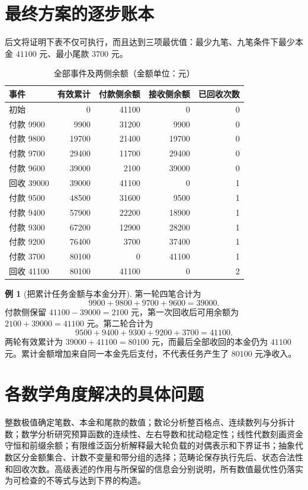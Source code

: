 \documentclass[UTF8,a4paper]{ctexbook}
\theoremstyle{definition}
\newtheorem{example}[theorem]{例}
\numberwithin{equation}{chapter}
\newcommand{\1}{\mathbf{1}}
\begin{document}
\section{最终方案的逐步账本}
后文将证明下表不仅可执行，而且达到三项最优值：最少九笔、九笔条件下最少本金 $41100$ 元、最小尾款 $3700$ 元。

\begin{table}[htbp]
\centering
\caption{全部事件及两侧余额（金额单位：元）}\label{model:ledger}
\begin{tabular}{@{}lrrrr@{}}
\toprule
事件 & 有效累计 & 付款侧余额 & 接收侧余额 & 已回收次数\\
\midrule
初始 & 0 & 41100 & 0 & 0\\
付款 9900 & 9900 & 31200 & 9900 & 0\\
付款 9800 & 19700 & 21400 & 19700 & 0\\
付款 9700 & 29400 & 11700 & 29400 & 0\\
付款 9600 & 39000 & 2100 & 39000 & 0\\
回收 39000 & 39000 & 41100 & 0 & 1\\
付款 9500 & 48500 & 31600 & 9500 & 1\\
付款 9400 & 57900 & 22200 & 18900 & 1\\
付款 9300 & 67200 & 12900 & 28200 & 1\\
付款 9200 & 76400 & 3700 & 37400 & 1\\
付款 3700 & 80100 & 0 & 41100 & 1\\
回收 41100 & 80100 & 41100 & 0 & 2\\
\bottomrule
\end{tabular}
\end{table}

\begin{example}[把累计任务金额与本金分开]
第一轮四笔合计为
\[
9900+9800+9700+9600=39000.
\]
付款侧保留 $41100-39000=2100$ 元，第一次回收后可用余额为 $2100+39000=41100$ 元。第二轮合计为
\[
9500+9400+9300+9200+3700=41100.
\]
两轮有效累计为 $39000+41100=80100$ 元，而最后全部收回的本金仍为 $41100$ 元。累计金额增加来自同一本金先后支付，不代表任务产生了 $80100$ 元净收入。
\end{example}

\section{各数学角度解决的具体问题}
整数极值确定笔数、本金和尾款的数值；数论分析整百格点、连续数列与分拆计数；数学分析研究预算函数的连续性、左右导数和扰动稳定性；线性代数刻画资金守恒和前缀余额；有限维泛函分析解释最大轮负载的对偶表示和下界证书；抽象代数区分金额集合、计数不变量和带分组的选择；范畴论保存执行先后、状态合法性和回收次数。高级表述的作用与所保留的信息会分别说明，所有数值最优性仍落实为可检查的不等式与达到下界的构造。
\end{document}
